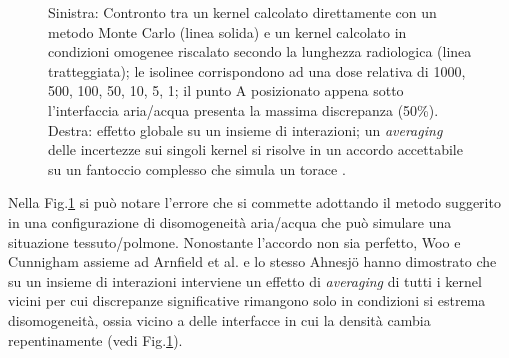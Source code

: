 {\begin{figure}[!t]
\caption{Sinistra: Contronto tra un kernel calcolato direttamente con un metodo Monte Carlo (linea solida) e un kernel calcolato in condizioni omogenee riscalato secondo la lunghezza radiologica (linea tratteggiata); le isolinee corrispondono ad una dose relativa di 1000, 500, 100, 50, 10, 5, 1; il punto A posizionato appena sotto l'interfaccia aria/acqua presenta la massima discrepanza (50\%). Destra: effetto globale su un insieme di interazioni; un \textit{averaging} delle incertezze sui singoli kernel si risolve in un accordo accettabile su un fantoccio complesso che simula un torace \cite{Woo1990,Arnfield2000,Ahnesjo1989}.}
\label{fig:kern_dens}
\end{figure}
Nella Fig.\ref{fig:kern_dens} si può notare l'errore che si commette adottando il metodo suggerito in una configurazione di disomogeneità aria/acqua che può simulare una situazione tessuto/polmone. Nonostante l'accordo non sia perfetto, Woo e Cunnigham \cite{Woo1990} assieme ad Arnfield et al. \cite{Arnfield2000} e lo stesso Ahnesj\"{o} \cite{Ahnesjo1989} hanno dimostrato che su un insieme di interazioni interviene un effetto di \textit{averaging} di tutti i kernel vicini per cui discrepanze significative rimangono solo in condizioni si estrema disomogeneità, ossia vicino a delle interfacce in cui la densità cambia repentinamente (vedi Fig.\ref{fig:kern_dens}).

}
